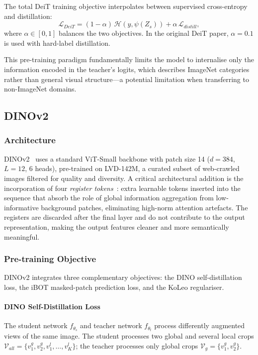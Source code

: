 \documentclass[journal]{IEEEtran}
\begin{document}
The total DeiT training objective interpolates between supervised cross-entropy and distillation:
\begin{equation}
    \mathcal{L}_{DeiT} = (1 - \alpha)\,\mathcal{H}(y, \psi(Z_s)) +
    \alpha\,\mathcal{L}_{distill},
    \label{eq:deit_loss}
\end{equation}
where $\alpha \in [0, 1]$ balances the two objectives. In the original DeiT paper,
$\alpha = 0.1$ is used with hard-label distillation.

This pre-training paradigm fundamentally limits the model to internalise only the information
encoded in the teacher's logits, which describes ImageNet categories rather than general visual
structure—a potential limitation when transferring to non-ImageNet domains.

\subsection{DINOv2}
\label{subsec:dinov2}

\subsubsection{Architecture}
DINOv2~\cite{oquab2023dinov2} uses a standard ViT-Small backbone with patch size 14
($d=384$, $L=12$, 6 heads), pre-trained on LVD-142M, a curated subset of web-crawled images
filtered for quality and diversity. A critical architectural addition is the incorporation of
four \textit{register tokens}~\cite{darcet2023registers}: extra learnable tokens inserted into
the sequence that absorb the role of global information aggregation from low-informative
background patches, eliminating high-norm attention artefacts. The registers are discarded
after the final layer and do not contribute to the output representation, making the output
features cleaner and more semantically meaningful.

\subsubsection{Pre-training Objective}
DINOv2 integrates three complementary objectives: the DINO self-distillation loss, the iBOT
masked-patch prediction loss, and the KoLeo regulariser.

\paragraph{DINO Self-Distillation Loss}
The student network $f_{\theta_s}$ and teacher network $f_{\theta_t}$ process differently
augmented views of the same image. The student processes two global and several local crops
$\mathcal{V}_{all} = \{v_1^g, v_2^g, v_1^l, \ldots, v_K^l\}$; the teacher processes only
global crops $\mathcal{V}_g = \{v_1^g, v_2^g\}$.
\end{document}

